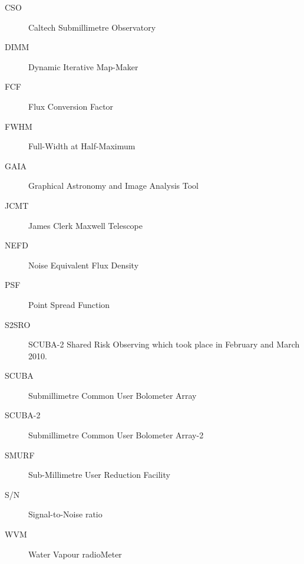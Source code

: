 \documentclass[twoside,11pt]{article}
\renewcommand{\_}{\texttt{\symbol{95}}}
\begin{document}
\begin{description}

\item[CSO]\quad Caltech Submillimetre Observatory

\item[DIMM]\quad Dynamic Iterative Map-Maker

\item[FCF]\quad Flux Conversion Factor

\item[FWHM]\quad Full-Width at Half-Maximum

\item[GAIA]\quad Graphical Astronomy and Image Analysis Tool

\item[JCMT]\quad James Clerk Maxwell Telescope

\item[NEFD]\quad Noise Equivalent Flux Density

\item[PSF]\quad Point Spread Function

\item[S2SRO]\quad SCUBA-2 Shared Risk Observing which took place in
  February and March 2010.

\item[SCUBA]\quad Submillimetre Common User Bolometer Array

\item[SCUBA-2]\quad Submillimetre Common User Bolometer Array-2

\item[SMURF]\quad Sub-Millimetre User Reduction Facility

\item[S/N]\quad Signal-to-Noise ratio

\item[WVM]\quad Water Vapour radioMeter


\end{description}
\end{document}
